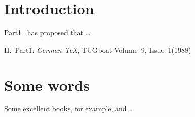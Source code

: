 \documentclass[10pt]{ctexart}
\begin{document}



\section{Introduction}
Part1~\cite{germenTeX} has proposed that \ldots

\begin{thebibliography}{99}
 H.~Part1: \emph{German \TeX},
TUGboat Volume~9, Issue~1(1988)
\end{thebibliography}



%

\section{Some words}
Some excellent books, for example, \cite{Alice13}
and \cite{Alice13} \ldots



% 


\end{document}
